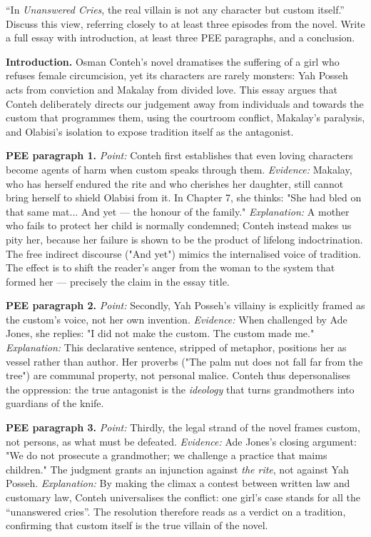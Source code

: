\documentclass[11pt]{article}
\begin{document}
\begin{exercice}
``In \emph{Unanswered Cries}, the real villain is not any character but custom itself.'' Discuss this view, referring closely to at least three episodes from the novel. Write a full essay with introduction, at least three PEE paragraphs, and a conclusion.
\end{exercice}

\begin{corrige}
\textbf{Introduction.} Osman Conteh's novel dramatises the suffering of a girl who refuses female circumcision, yet its characters are rarely monsters: Yah Posseh acts from conviction and Makalay from divided love. This essay argues that Conteh deliberately directs our judgement away from individuals and towards the custom that programmes them, using the courtroom conflict, Makalay's paralysis, and Olabisi's isolation to expose tradition itself as the antagonist.

\textbf{PEE paragraph 1.} \emph{Point:} Conteh first establishes that even loving characters become agents of harm when custom speaks through them. \emph{Evidence:} Makalay, who has herself endured the rite and who cherishes her daughter, still cannot bring herself to shield Olabisi from it. In Chapter 7, she thinks: "She had bled on that same mat... And yet --- the honour of the family." \emph{Explanation:} A mother who fails to protect her child is normally condemned; Conteh instead makes us pity her, because her failure is shown to be the product of lifelong indoctrination. The free indirect discourse ("And yet") mimics the internalised voice of tradition. The effect is to shift the reader's anger from the woman to the system that formed her --- precisely the claim in the essay title.

\textbf{PEE paragraph 2.} \emph{Point:} Secondly, Yah Posseh's villainy is explicitly framed as the custom's voice, not her own invention. \emph{Evidence:} When challenged by Ade Jones, she replies: "I did not make the custom. The custom made me." \emph{Explanation:} This declarative sentence, stripped of metaphor, positions her as vessel rather than author. Her proverbs ("The palm nut does not fall far from the tree") are communal property, not personal malice. Conteh thus depersonalises the oppression: the true antagonist is the \emph{ideology} that turns grandmothers into guardians of the knife.

\textbf{PEE paragraph 3.} \emph{Point:} Thirdly, the legal strand of the novel frames custom, not persons, as what must be defeated. \emph{Evidence:} Ade Jones's closing argument: "We do not prosecute a grandmother; we challenge a practice that maims children." The judgment grants an injunction against \emph{the rite}, not against Yah Posseh. \emph{Explanation:} By making the climax a contest between written law and customary law, Conteh universalises the conflict: one girl's case stands for all the ``unanswered cries''. The resolution therefore reads as a verdict on a tradition, confirming that custom itself is the true villain of the novel.


\end{corrige}
\end{document}
